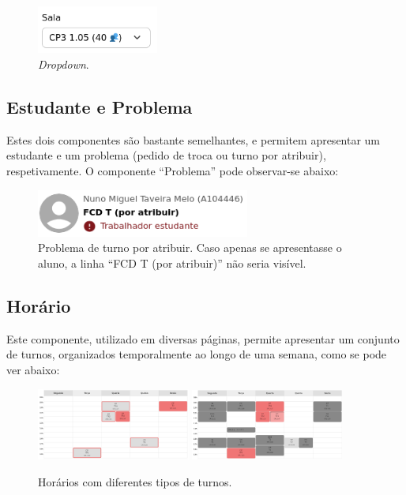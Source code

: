 \documentclass[12pt, a4paper]{article}
\begin{document}
\begin{figure}[H]
    \centering
    \includegraphics[width=4cm]{res/components/dropdown.png}
    \caption{\emph{Dropdown}.}
    \label{dropdown}
\end{figure}

\subsection{Estudante e Problema}

Estes dois componentes são bastante semelhantes, e permitem apresentar um estudante e um problema
(pedido de troca ou turno por atribuir), respetivamente. O componente ``Problema'' pode observar-se
abaixo:

\begin{figure}[H]
    \centering
    \includegraphics[width=7cm]{res/components/problem.png}
    \caption{
        \onehalfspacing
        Problema de turno por atribuir. Caso apenas se apresentasse o aluno, a linha
        ``FCD T (por atribuir)'' não seria visível.
    }
    \label{problem}
\end{figure}

\subsection{Horário}

Este componente, utilizado em diversas páginas, permite apresentar um conjunto de turnos,
organizados temporalmente ao longo de uma semana, como se pode ver abaixo:

\begin{figure}[H]
    \centering
    \includegraphics[width=0.45\textwidth]{res/components/schedule-1.png}
    \includegraphics[width=0.45\textwidth]{res/components/schedule-2.png}
    \caption{Horários com diferentes tipos de turnos.}
    \label{schedule}
\end{figure}
\end{document}
